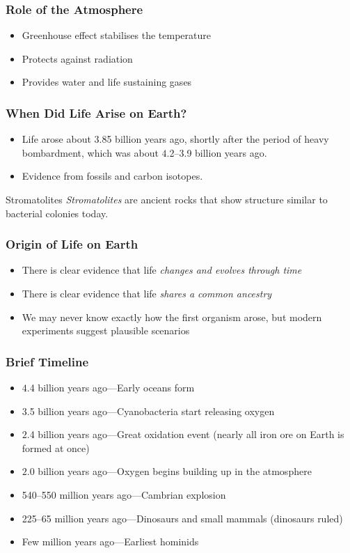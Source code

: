 \documentclass[class=article, crop=false]{standalone}
\begin{document}
  \subsubsection{Role of the Atmosphere}
  \begin{itemize}
    \item Greenhouse effect stabilises the temperature
    \item Protects against radiation
    \item Provides water and life sustaining gases
  \end{itemize}
  \subsubsection{When Did Life Arise on Earth?}
  \begin{itemize}
    \item Life arose about $3$.85 billion years ago, shortly after the period of heavy bombardment, which was about $4$.2--3.9 billion years ago.
    \item Evidence from fossils and carbon isotopes.
  \end{itemize}
  \begin{definition}{Stromatolites}
    \emph{Stromatolites} are ancient rocks that show structure similar to bacterial colonies today.
  \end{definition}
  \subsubsection{Origin of Life on Earth}
  \begin{itemize}
    \item There is clear evidence that life \emph{changes and evolves through time}
    \item There is clear evidence that life \emph{shares a common ancestry}
    \item We may never know exactly how the first organism arose, but modern experiments suggest plausible scenarios
  \end{itemize}
  \subsubsection{Brief Timeline}
  \begin{itemize}
    \item $4$.4 billion years ago---Early oceans form
    \item $3$.5 billion years ago---Cyanobacteria start releasing oxygen
    \item $2$.4 billion years ago---Great oxidation event (nearly all iron ore on Earth is formed at once)
    \item $2$.0 billion years ago---Oxygen begins building up in the atmosphere
    \item 540--550 million years ago---Cambrian explosion
    \item 225--65 million years ago---Dinosaurs and small mammals (dinosaurs ruled)
    \item Few million years ago---Earliest hominids
  \end{itemize}
\end{document}
